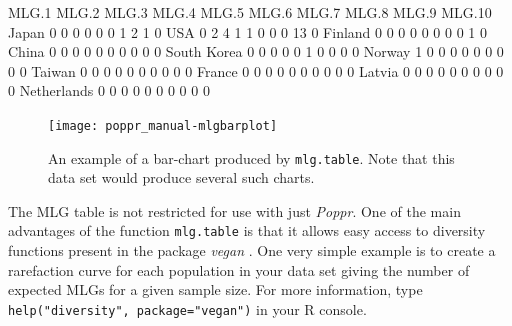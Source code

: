 \documentclass[letterpaper]{article}
\begin{document}
\begin{Schunk}
\begin{Soutput}
            MLG.1 MLG.2 MLG.3 MLG.4 MLG.5 MLG.6 MLG.7 MLG.8 MLG.9 MLG.10
Japan           0     0     0     0     0     0     1     2     1      0
USA             0     2     4     1     1     0     0     0    13      0
Finland         0     0     0     0     0     0     0     0     1      0
China           0     0     0     0     0     0     0     0     0      0
South Korea     0     0     0     0     0     1     0     0     0      0
Norway          1     0     0     0     0     0     0     0     0      0
Taiwan          0     0     0     0     0     0     0     0     0      0
France          0     0     0     0     0     0     0     0     0      0
Latvia          0     0     0     0     0     0     0     0     0      0
Netherlands     0     0     0     0     0     0     0     0     0      0
\end{Soutput}
\end{Schunk}
\begin{figure}[h!]
  \centering
  \caption{\footnotesize An example of a bar-chart produced by \texttt{mlg.table}. Note that this data set would produce several such charts.}
  \label{nortable}
\texttt{[image: poppr\_manual-mlgbarplot]}
\end{figure}
\newpage

The MLG table is not restricted for use with just \textit{Poppr}. One of the main advantages of the function \texttt{mlg.table} is that it allows easy access to diversity functions present in the package \textit{vegan} \cite{vegan}. One very simple example is to create a rarefaction curve for each population in your data set giving the number of expected MLGs for a given sample size. For more information, type \texttt{help("diversity", package="vegan")} in your R console.
\end{document}
